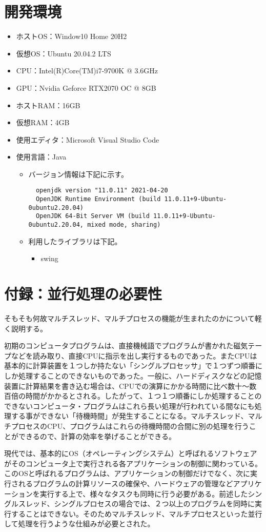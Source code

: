 \documentclass[dvipdfmx, titlepage]{jsarticle}
\begin{document}
\section{開発環境}
\begin{itemize}
  \item ホストOS：Window10 Home 20H2
  \item 仮想OS：Ubuntu 20.04.2 LTS
  \item CPU：Intel(R)Core(TM)i7-9700K @ 3.6GHz
  \item GPU：Nvidia Geforce RTX2070 OC @ 8GB
  \item ホストRAM：16GB
  \item 仮想RAM：4GB
  \item 使用エディタ：Microsoft Visual Studio Code
  \item 使用言語：Java
  \begin{itemize}
    \item バージョン情報は下記に示す。
    \begin{verbatim}
  openjdk version "11.0.11" 2021-04-20
  OpenJDK Runtime Environment (build 11.0.11+9-Ubuntu-0ubuntu2.20.04)
  OpenJDK 64-Bit Server VM (build 11.0.11+9-Ubuntu-0ubuntu2.20.04, mixed mode, sharing)
    \end{verbatim}
    \item 利用したライブラリは下記。
    \begin{itemize}
      \item swing
    \end{itemize}
  \end{itemize}
\end{itemize}
\section{付録：並行処理の必要性}
そもそも何故マルチスレッド、マルチプロセスの機能が生まれたのかについて軽く説明する。\par
初期のコンピュータプログラムは、直接機械語でプログラムが書かれた磁気テープなどを読み取り、直接CPUに指示を出し実行するものであった。またCPUは基本的に計算装置を１つしか持たない「シングルプロセッサ」で１つずつ順番にしか処理することのできないものであった。一般に、ハードディスクなどの記憶装置に計算結果を書き込む場合は、CPUでの演算にかかる時間に比べ数十〜数百倍の時間がかかるとされる。したがって、１つ１つ順番にしか処理することのできないコンピュータ・プログラムはこれら長い処理が行われている間なにも処理する事ができない「待機時間」が発生することになる。マルチスレッド、マルチプロセスのCPU、プログラムはこれらの待機時間の合間に別の処理を行うことができるので、計算の効率を挙げることができる。\par
現代では、基本的にOS（オペレーティングシステム）と呼ばれるソフトウェアがそのコンピュータ上で実行される各アプリケーションの制御に関わっている。このOSと呼ばれるプログラムは、アプリケーションの制御だけでなく、次に実行されるプログラムの計算リソースの確保や、ハードウェアの管理などアプリケーションを実行する上で、様々なタスクも同時に行う必要がある。前述したシングルスレッド、シングルプロセスの場合では、２つ以上のプログラムを同時に実行することはできない。そのためマルチスレッド、マルチプロセスといった並行して処理を行うような仕組みが必要とされた。
\end{document}
